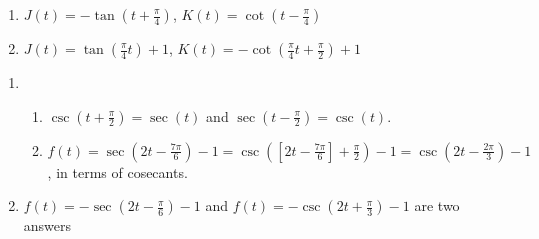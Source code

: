 \begin{multicols}{2}
\begin{enumerate}
\setcounter{enumi}{\value{HW}}

\item  $J(t) = -\tan\left(t+ \frac{\pi}{4} \right)$, $K(t) = \cot  \left(t - \frac{\pi}{4} \right)$

\item  $J(t) = \tan\left( \frac{\pi}{4} t \right) + 1$, $K(t) = -\cot\left( \frac{\pi}{4} t + \frac{\pi}{2} \right) + 1$

\setcounter{HW}{\value{enumi}}
\end{enumerate}
\end{multicols}


\begin{enumerate}
\setcounter{enumi}{\value{HW}}

\item   \begin{enumerate} \item  $\csc\left(t + \frac{\pi}{2} \right) = \sec(t)$ and $\sec\left(t - \frac{\pi}{2} \right) = \csc(t)$.

\item  $f(t) = \sec\left( 2 t - \frac{7\pi}{6} \right) -1 = \csc\left( \left[2 t - \frac{7\pi}{6}\right] + \frac{\pi}{2}  \right) -1 = \csc\left( 2 t - \frac{2\pi}{3} \right) -1 $, in terms of cosecants.

\end{enumerate}


\item  $f(t) = - \sec\left(2t - \frac{\pi}{6} \right)-1$ and  $f(t) = -\csc\left(2t + \frac{\pi}{3} \right) -1$ are two answers



\setcounter{HW}{\value{enumi}}

\end{enumerate}


